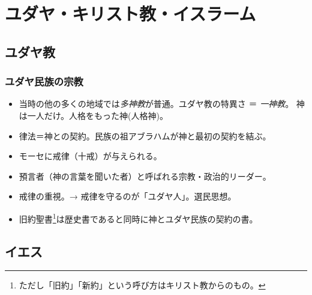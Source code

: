 \documentclass[uplatex,dvipdfmx]{jsarticle} \usepackage{mystyle}%
\title{}
\begin{document}
\maketitle


\else\chapter{ユダヤ・キリスト教・イスラーム}

\fi
\section{ユダヤ教}


\subsection{ユダヤ民族の宗教}


\begin{itemize}
\item 当時の他の多くの地域では\emph{多神教}が普通。ユダヤ教の特異さ ＝ \emph{一神教}。
  神は一人だけ。人格をもった神(人格神)。
\item 律法＝神との契約。民族の祖アブラハムが神と最初の契約を結ぶ。
\item モーセに戒律（十戒）が与えられる。
\item 預言者（神の言葉を聞いた者）と呼ばれる宗教・政治的リーダー。
\item 戒律の重視。→ 戒律を守るのが「ユダヤ人」。選民思想。
\item 旧約聖書\footnote{ただし「旧約」「新約」という呼び方はキリスト教からのもの。}は歴史書であると同時に神とユダヤ民族の契約の書。

\end{itemize}

\section{イエス}
\end{document}
